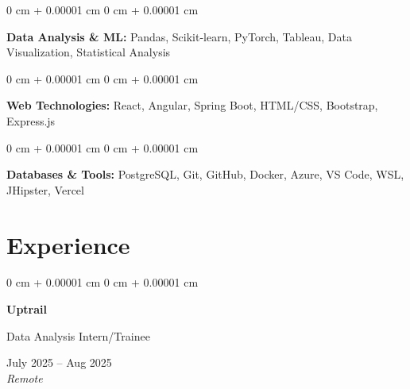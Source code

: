 \documentclass[10pt, a4paper]{article}
\newenvironment{onecolentry}{
    \begin{adjustwidth}{
        0 cm + 0.00001 cm
    }{
        0 cm + 0.00001 cm
    }
}{
    \end{adjustwidth}
} %
\newenvironment{twocolentry}[2][]{
    \onecolentry
    \def\secondColumn{#2}
    \setcolumnwidth{\fill, 4.5 cm}
    \begin{paracol}{2}
}{
    \switchcolumn \raggedleft \secondColumn
    \end{paracol}
    \endonecolentry
} %
\begin{document}
    \vspace{0.15 cm}

    \begin{onecolentry}
        \textbf{Data Analysis \& ML:} Pandas, Scikit-learn, PyTorch, Tableau, Data Visualization, Statistical Analysis
    \end{onecolentry}

    \vspace{0.15 cm}

    \begin{onecolentry}
        \textbf{Web Technologies:} React, Angular, Spring Boot, HTML/CSS, Bootstrap, Express.js
    \end{onecolentry}

    \vspace{0.15 cm}

    \begin{onecolentry}
        \textbf{Databases \& Tools:} PostgreSQL, Git, GitHub, Docker, Azure, VS Code, WSL, JHipster, Vercel
    \end{onecolentry}

    \vspace{0.2 cm}


    \section{Experience}

    \begin{twocolentry}{
        July 2025 -- Aug 2025 \\
        \textit{Remote}
    }
        \textbf{Uptrail}
        
        Data Analysis Intern/Trainee
    \end{twocolentry}
\end{document}
